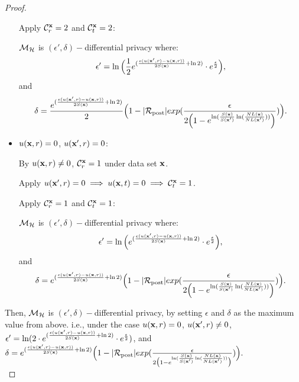 \documentclass{article}
\begin{document}
\begin{proof}
\begin{itemize}
      Apply  $\mathcal{C}^{\textbf{x}}_{r} = 2$ and  $\mathcal{C}^{\textbf{x}}_{t} = 2$:

      $\mathcal{M}_{\mathcal{H}}$ is $(\epsilon', \delta)-$differential privacy where:
      $$
      \epsilon' = \ln \Big( \frac{1}{2} e^{(\frac{\epsilon (u(\textbf{x}', {r}) - u(\textbf{x}, {r}))}{2 S(\textbf{x})} + \ln 2)} \cdot e^{\frac{\epsilon}{2}} \Big),
      $$ and
      $$
      \delta = \frac{e^{(\frac{\epsilon (u(\textbf{x}', {r}) - u(\textbf{x}, {r}))}{2 S(\textbf{x})} + \ln 2)}}{2}
      \Big( 1 - |\mathcal{R}_{\textup{post}}|exp(\frac{\epsilon}{2 \Big( 1 - e ^ {\ln(\frac{S(\textbf{x})}{S(\textbf{x}')} \ln(\frac{NL(\textbf{x})}{NL(\textbf{x}')}))} \Big)}) \Big).
      $$ 

    \item {\boldmath$u(\textbf{x}, {r}) = 0$, $u(\textbf{x}', {r}) = 0$}:

      By $u(\textbf{x}, {r}) \neq 0$, $\mathcal{C}^{\textbf{x}}_{r} = 1$ under data set $\textbf{x}$.
      
      Apply $u(\textbf{x}', {r}) = 0 \implies u(\textbf{x}, {t}) = 0 \implies \mathcal{C}^{\textbf{x}}_{t} = 1$.

      Apply  $\mathcal{C}^{\textbf{x}}_{r} = 1$ and  $\mathcal{C}^{\textbf{x}}_{t} = 1$:

      $\mathcal{M}_{\mathcal{H}}$ is $(\epsilon', \delta)-$differential privacy where:
      $$
      \epsilon' = \ln \Big( e^{(\frac{\epsilon (u(\textbf{x}', {r}) - u(\textbf{x}, {r}))}{2 S(\textbf{x})} + \ln 2)} \cdot e^{\frac{\epsilon}{2}} \Big),
      $$ and
      $$
      \delta = e^{(\frac{\epsilon (u(\textbf{x}', {r}) - u(\textbf{x}, {r}))}{2 S(\textbf{x})} + \ln 2)}
      \Big( 1 - |\mathcal{R}_{\textup{post}}|exp(\frac{\epsilon}{2 \Big( 1 - e ^ {\ln(\frac{S(\textbf{x})}{S(\textbf{x}')} \ln(\frac{NL(\textbf{x})}{NL(\textbf{x}')}))} \Big)}) \Big).
      $$ 

  \end{itemize}

	
      Then, $\mathcal{M}_{\mathcal{H}}$ is $(\epsilon', \delta)-$differential privacy, by setting $\epsilon $ and $\delta$ as the maximum value from above.
      i.e., under the case {\boldmath$u(\textbf{x}, {r}) = 0$, $u(\textbf{x}', {r}) \neq 0$}, 
      $
      \epsilon' = \ln (2 \cdot e^{(\frac{\epsilon (u(\textbf{x}', {r}) - u(\textbf{x}, {r}))}{2 S(\textbf{x})} + \ln 2)} \cdot e^{\frac{\epsilon}{2}})
      $, and
      $
      \delta = e^{(\frac{\epsilon (u(\textbf{x}', {r}) - u(\textbf{x}, {r}))}{2 S(\textbf{x})} + \ln 2)}
      \Big( 1 - |\mathcal{R}_{\textup{post}}|exp(\frac{\epsilon}{2 \big(1 - e ^ {\ln(\frac{S(\textbf{x})}{S(\textbf{x}')} \ln(\frac{NL(\textbf{x})}{NL(\textbf{x}')}))} \big)}) \Big).
      $\\

\end{proof}
\end{document}
